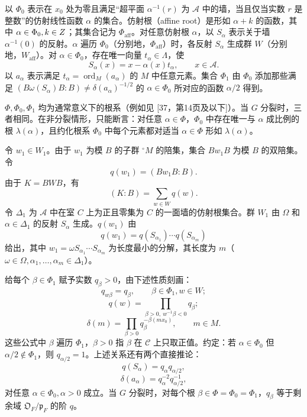 以 $\Phi_0$ 表示在 $x_0$ 处为零且满足“超平面 $\alpha^{-1}(r)$ 为 $\mathcal A$ 中的墙，当且仅当实数 $r$ 是整数”的仿射线性函数 $\alpha$ 的集合。仿射根（affine root）是形如 $\alpha+k$ 的函数，其中 $\alpha\in\Phi_0,k\in Z$；其集合记为 $\Phi_{\mathrm{aff}}$。对任意仿射根 $\alpha$，以 $S_\alpha$ 表示关于墙 $\alpha^{-1}(0)$ 的反射。$\alpha$ 遍历 $\Phi_0$（分别地，$\Phi_{\mathrm{aff}}$）时，各反射 $S_\alpha$ 生成群 $W$（分别地，$W_{\mathrm{aff}}$）。对 $\alpha\in\Phi_0$，存在唯一向量 $t_\alpha\in\Lambda$，使
\[
S_\alpha(x)=x-\alpha(x)t_\alpha,\qquad x\in\mathcal A.\tag{20}
\]
以 $a_\alpha$ 表示满足 $t_\alpha=\operatorname{ord}_M(a_\alpha)$ 的 $M$ 中任意元素。集合 $\Phi_1$ 由 $\Phi_0$ 添加那些满足 $(B\omega(S_\alpha)B:B)\ne\delta(a_\alpha)^{-1/2}$ 的 $\alpha\in\Phi_0$ 所对应的函数 $\alpha/2$ 得到。

$\Phi,\Phi_0,\Phi_1$ 均为通常意义下的根系（例如见 [37，第14页及以下]）。当 $G$ 分裂时，三者相同。在非分裂情形，只能断言：对任意 $\alpha\in\Phi$，$\Phi_0$ 中存在唯一与 $\alpha$ 成比例的根 $\lambda(\alpha)$，且约化根系 $\Phi_0$ 中每个元素都对适当 $\alpha\in\Phi$ 形如 $\lambda(\alpha)$。

令 $w_1\in W_1$。由于 $w_1$ 为模 $B$ 的子群 $^\circ M$ 的陪集，集合 $Bw_1B$ 为模 $B$ 的双陪集。令
\[
q(w_1)=(Bw_1B:B).\tag{21}
\]
由于 $K=BWB$，有
\[
(K:B)=\sum_{w\in W}q(w).\tag{22}
\]
令 $\Delta_1$ 为 $\mathcal A$ 中在室 $C$ 上为正且零集为 $C$ 的一面墙的仿射根集合。群 $W_1$ 由 $\Omega$ 和 $\alpha\in\Delta_1$ 的反射 $S_\alpha$ 生成。$q(w_1)$ 由
\[
q(w_1)=q(S_{\alpha_1})\cdots q(S_{\alpha_m})\tag{23}
\]
给出，其中 $w_1=\omega S_{\alpha_1}\cdots S_{\alpha_m}$ 为长度最小的分解，其长度为 $m$（$\omega\in\Omega,\alpha_1,\ldots,\alpha_m\in\Delta_1$）。

给每个 $\beta\in\Phi_1$ 赋予实数 $q_\beta>0$，由下述性质刻画：
\[
q_{w\beta}=q_\beta,\qquad\beta\in\Phi_1,w\in W;\tag{24a}
\]
\[
q(w)=\prod_{\beta>0,\ w^{-1}\beta<0}q_\beta;\tag{24b}
\]
\[
\delta(m)=\prod_{\beta>0}q_\beta^{-\beta(mx_0)},\qquad m\in M.\tag{24c}
\]
这些公式中 $\beta$ 遍历 $\Phi_1$，$\beta>0$ 指 $\beta$ 在 $\mathcal C$ 上只取正值。约定：若 $\alpha\in\Phi_0$ 但 $\alpha/2\notin\Phi_1$，则 $q_{\alpha/2}=1$。上述关系还有两个直接推论：
\[
q(S_\alpha)=q_\alpha q_{\alpha/2},\tag{24d}
\]
\[
\delta(a_\alpha)=q_\alpha^{-2}q_{\alpha/2}^{-1},\tag{24e}
\]
对任意 $\alpha\in\Phi_0,\alpha>0$ 成立。当 $G$ 分裂时，对每个根 $\beta\in\Phi=\Phi_0=\Phi_1$，$q_\beta$ 等于剩余域 $\mathfrak O_F/\mathfrak p_F$ 的阶 $q$。

